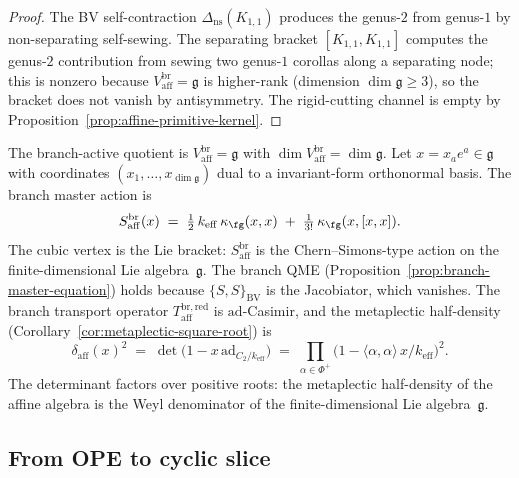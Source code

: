 \begin{proof}
The BV self-contraction $\Delta_{\mathrm{ns}}(K_{1,1})$ produces
the genus-$2$ from genus-$1$ by non-separating self-sewing. The
separating bracket $[K_{1,1}, K_{1,1}]$ computes the genus-$2$
contribution from sewing two genus-$1$ corollas along a separating
node; this is nonzero because $V_{\mathrm{aff}}^{\mathrm{br}}
= \mathfrak{g}$ is higher-rank (dimension $\dim\mathfrak{g} \geq 3$),
so the bracket does not vanish by antisymmetry. The rigid-cutting
channel is empty by
Proposition~\ref{prop:affine-primitive-kernel}.
\end{proof}

\begin{computation}
\label{comp:affine-branch-bv}
The branch-active quotient is $V_{\mathrm{aff}}^{\mathrm{br}}
= \mathfrak{g}$ with $\dim V_{\mathrm{aff}}^{\mathrm{br}}
= \dim\mathfrak{g}$. Let $x = x_a e^a \in \mathfrak{g}$ with
coordinates $(x_1, \ldots, x_{\dim\mathfrak{g}})$ dual to a
invariant-form orthonormal basis. The branch master action is
\begin{equation}\label{eq:affine-branch-action}
S_{\mathrm{aff}}^{\mathrm{br}}(x)
\;=\;
\tfrac{1}{2}\,k_{\mathrm{eff}}\,\kappa_{\fg}(x,x)
\;+\;
\tfrac{1}{3!}\,\kappa_{\fg}(x,[x,x]).
\end{equation}
The cubic vertex is the Lie bracket: $S_{\mathrm{aff}}^{\mathrm{br}}$
is the Chern--Simons-type action on the finite-dimensional Lie
algebra~$\mathfrak{g}$. The branch QME
\textup{(}Proposition~\textup{\ref{prop:branch-master-equation})}
holds because $\{S,S\}_{\mathrm{BV}}$ is the Jacobiator, which
vanishes. The branch transport operator
$T_{\mathrm{aff}}^{\mathrm{br,red}}$ is $\mathrm{ad}$-Casimir,
and the metaplectic half-density
\textup{(}Corollary~\textup{\ref{cor:metaplectic-square-root})} is
\begin{equation}\label{eq:affine-metaplectic}
\delta_{\mathrm{aff}}(x)^2
\;=\;
\det\bigl(1 - x\,\mathrm{ad}_{C_2/k_{\mathrm{eff}}}\bigr)
\;=\;
\prod_{\alpha \in \Phi^+}
\bigl(1 - \langle\alpha,\alpha\rangle\,x/k_{\mathrm{eff}}\bigr)^2.
\end{equation}
The determinant factors over positive roots: the metaplectic
half-density of the affine algebra is the Weyl denominator
of the finite-dimensional Lie algebra~$\mathfrak{g}$.
\end{computation}

\subsection{From OPE to cyclic slice}
\label{subsec:affine-ope-cyclic-slice}

